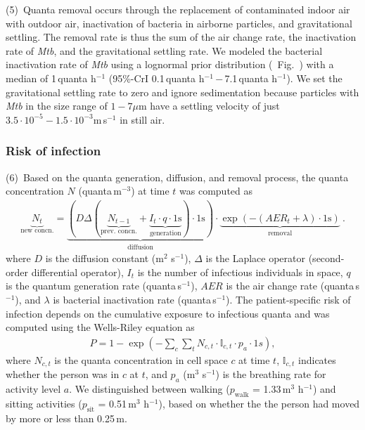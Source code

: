 \documentclass[fleqn,11pt]{wlscirep}
\begin{document}
(5)~Quanta removal occurs through the replacement of contaminated indoor air with outdoor air, inactivation of bacteria in airborne particles, and gravitational settling. The removal rate is thus the sum of the air change rate, the inactivation rate of \emph{Mtb}, and the gravitational settling rate. We modeled the bacterial inactivation rate of \emph{Mtb} using a lognormal prior distribution (\supp~Fig.~) with a median of 1\,quanta h$^{-1}$ (95\%-CrI 0.1\,quanta h$^{-1}$\,$-$\,7.1\,quanta h$^{-1}$)\cite{Loudon1969AMRRD,Lever2000LettersAppliedMicrobio,Gannon2007ResVetSci,Klein2014IJMyco}. We set the gravitational settling rate to zero and ignore sedimentation because particles with \emph{Mtb} in the size range of $1-7\mu$m\cite{Fennelly2020Lancet} have a settling velocity of just $3.5\cdot 10^{-5}-1.5\cdot 10^{-3}$m\,s$^{-1}$ in still air\cite{Vuorinen2020SafSci}.

\subsubsection*{Risk of infection}

(6)~Based on the quanta generation, diffusion, and removal process, the quanta concentration $N$ (quanta\,m$^{-3}$) at time $t$ was computed as 
\begin{align}\label{eq:spattemp-N}
    \underbrace{N_{t}}_{\text{new concn.}} = \underbrace{\left(D \Delta (\underbrace{N_{t-1}}_{\text{prev. concn.}} + \underbrace{I_t \cdot q \cdot 1\text{s}}_{\text{generation}}) \cdot 1\text{s}\right)}_{\text{diffusion}} \cdot \underbrace{\exp\left(-(AER_t + \lambda) \cdot 1\text{s}\right)}_{\text{removal}} ~.
\end{align}
where $D$ is the diffusion constant (m$^2$ s$^{-1}$), $\Delta$ is the Laplace operator (second-order differential operator), $I_t$ is the number of infectious individuals in space, $q$ is the quantum generation rate (quanta\,s$^{-1}$), $AER$ is the air change rate (quanta\,s$^{-1}$), and $\lambda$ is bacterial inactivation rate (quanta\,s$^{-1}$). The patient-specific risk of infection depends on the cumulative exposure to infectious quanta and was computed using the Wells-Riley equation as
\begin{align}
    P = 1-\exp\left(-\sum_c \sum_t N_{c,t} \cdot \mathbb{I}_{c,t} \cdot p_a \cdot 1s\right),
\end{align}
where $N_{c,t}$ is the quanta concentration in cell space $c$ at time $t$, $\mathbb{I}_{c,t}$ indicates whether the person was in $c$ at $t$, and $p_a$ (m$^3$ s$^{-1}$) is the breathing rate for activity level $a$. We distinguished between walking ($p_\mathrm{walk}$ = 1.33\,m$^3$ h$^{-1}$) and sitting activities ($p_\mathrm{sit}$ = 0.51\,m$^3$ h$^{-1}$)\cite{Adams1993}, based on whether the the person had moved by more or less than 0.25\,m.
\end{document}
